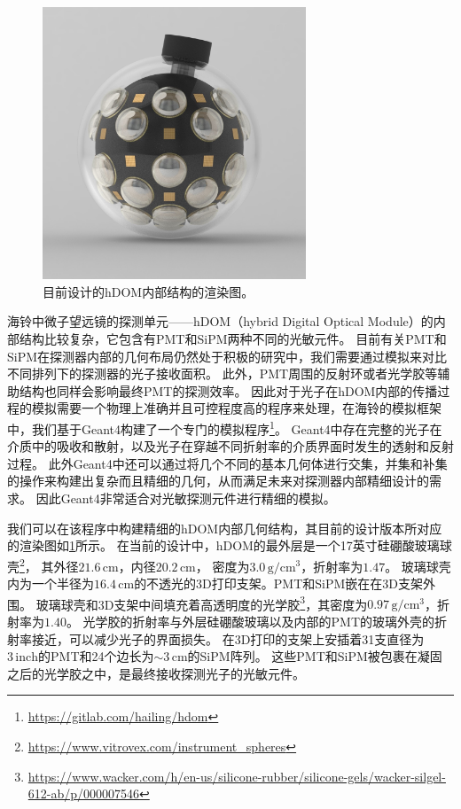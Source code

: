 \begin{figure}[htb]
\centering
    \includegraphics[width=0.7\textwidth]{img/hDOM_rendering.jpg}
    \caption{目前设计的hDOM内部结构的渲染图。}
    \label{fig:hDOM_rendering}
\end{figure}


海铃中微子望远镜的探测单元——hDOM（hybrid Digital Optical Module）的内部结构比较复杂，它包含有PMT和SiPM两种不同的光敏元件。
目前有关PMT和SiPM在探测器内部的几何布局仍然处于积极的研究中，我们需要通过模拟来对比不同排列下的探测器的光子接收面积。
此外，PMT周围的反射环或者光学胶等辅助结构也同样会影响最终PMT的探测效率\cite{KM3NeT_mDOM_cone:2013, IceCube-Gen2_gel_pad:2021}。
因此对于光子在hDOM内部的传播过程的模拟需要一个物理上准确并且可控程度高的程序来处理，在海铃的模拟框架中，我们基于Geant4构建了一个专门的模拟程序\footnote{\url{https://gitlab.com/hailing/hdom}}。
Geant4中存在完整的光子在介质中的吸收和散射，以及光子在穿越不同折射率的介质界面时发生的透射和反射过程。
此外Geant4中还可以通过将几个不同的基本几何体进行交集，并集和补集的操作来构建出复杂而且精细的几何，从而满足未来对探测器内部精细设计的需求。
因此Geant4非常适合对光敏探测元件进行精细的模拟。

我们可以在该程序中构建精细的hDOM内部几何结构，其目前的设计版本所对应的渲染图如\ref{fig:hDOM_rendering}所示。
在当前的设计中，hDOM的最外层是一个17英寸硅硼酸玻璃球壳\footnote{\url{https://www.vitrovex.com/instrument_spheres}}，
其外径$21.6\,\mathrm{cm}$，内径$20.2\,\mathrm{cm}$，
密度为$3.0\,\mathrm{g/cm^3}$，折射率为$1.47$。
玻璃球壳内为一个半径为$16.4\,\mathrm{cm}$的不透光的3D打印支架。PMT和SiPM嵌在在3D支架外围。
玻璃球壳和3D支架中间填充着高透明度的光学胶\footnote{\url{https://www.wacker.com/h/en-us/silicone-rubber/silicone-gels/wacker-silgel-612-ab/p/000007546}}，其密度为$0.97\,\mathrm{g/cm^3}$，折射率为$1.40$。
光学胶的折射率与外层硅硼酸玻璃以及内部的PMT的玻璃外壳的折射率接近，可以减少光子的界面损失。
在3D打印的支架上安插着31支直径为$3\,\mathrm{inch}$的PMT和24个边长为$\sim 3\,\mathrm{cm}$的SiPM阵列。
这些PMT和SiPM被包裹在凝固之后的光学胶之中，是最终接收探测光子的光敏元件。

